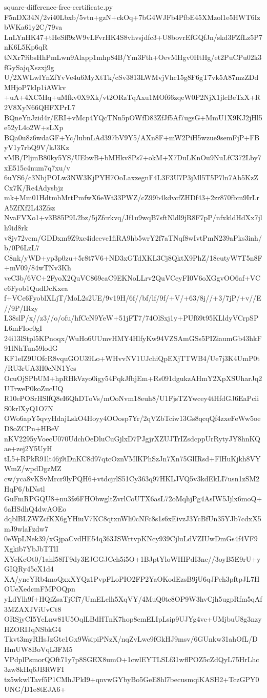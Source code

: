 \documentclass[11pt]{article}
\theoremstyle{definition}
\theoremstyle{remark}
\begin{document}
\begin{filecontents*}[overwrite]{square-difference-free-certificate.py}
F5nDX34N/2vi40Lbxb/5vtn+gzN+ckOq+7bG4WJFb4PfbE45XMzol1e5HWT6IzbWKa61y2C/79va
LnLYnHK47+tHeSff9zW9vLFvrHK4S8vhvsjdfc3+U8bovrEfGQfJn/skd3FZfLz5P7nK6L5Kp6qR
tNXr79ibsHhPmLwn9Alapp1mhp84B/Ym3Fth+OevMHgv0HtHg/et2PuCPu02k3fGySajqXszxj9g
U/2XWLwlYnZfYvVe4u6MyXtTk/cSv3813LWMvjVhc15g8F6gT7vk5A87mzZDdMHjoP7kIp1iAWkv
+uA+4XC5Hq+uMfkv0X9Xk/vt2ORzTqAxu1MOf66zqeW0P2NjX1jlcBeTxX+R2V8XyN66QHFXPrL7
BQneYnJzid4r/ERI+vMcp4YQcTNn5pOWfD83ZfJf5Af7ugsG+MmU1X9KJ2jHl5e52yL4o2W+sLXp
BQa0u8z6wdaGF+Yc/lubnLAd397bV9Y5/AXn8F+mW2PiH5wzue9semFjP+FByV1y7rbQ9V/kJ3Kz
vMB/PljmB80ky5YS/UEbwB+bMHkv8Ps7+okM+X7DuLKnOu9NuLfC372Lby7xE515c4num7q7xu/v
6uYS6/c3NbjPOLw3NW3KjPYH7OoLaxzegnF4L3F3U7P3jMl5T5P7ln7Ab5KzZCx7K/Re4Adysbjz
mk+Mm01HdtmbMrtPmfwX6eWt33PWZ/cZ99b4kdvcfZHDf43+2zr870fbm9IrLrA5ZfXf2L43Zfsz
NvaFVXo1+v3B85P9L2bz/5jZfcrkvq/Jf1u9wqB7sftNldl9jR8F7pP/nfxkldHdXx7jlh9id8rk
v8jv72vem/GDDxm9Z9xc4ideevc1fiRA9hb5wrY2f7aTNqf8wIvtPmN239aPks3inh/b/0P6LzL7
C8nk/yWD+yp3p0zu+5r8t7V6+ND3xGTdXKL3Cj8QktX9PhZ/18eutyW7T5n8F+mV09/84wTNv3Kh
veC3b/6VC+2FyoX2QuVC869caC9EKNoLLrv2QuVCeyFI0V6oXGgvOO6af+VCe6Fyob1QudDcKxea
f+VCe6FyoblXLjT/MoL2s2UE/9v19H/6f//bf/lf/9f/+V/+63/8j//+3/7jP/+v//E//9P/IRzy
L38slP/x//z3//o/ofu/hfCcN9YeW+51jFT7/74OlSxj1y+PUf69t95KLldyVCrpSPL6mFIoc0gI
24i13lStpl5KPnoqx/WuHo6UUmvHMY4HlfyKw94VZSAmGSs5PIZiaumGb43hkF91lNhTun59lodG
KF1elZ9UOfcR8vquGOU39Lo+WHvvNV1UJchiQpEXjTTWB4/Ue7j3K4UmP0t/RU3rUA3H0cNN1Ycs
OcuOjSPbUM+hpRHkVzyo0igy54PqkJfbjEm+Rs091dgukzAHmY2XpXSUharJq2UTrweP0koZucUQ
R10ePOSrHSlfQ8eI6QhDToVs/mOoNvm18euh8/U1FjsTZYwcey4tHfdGJ6EaPciiS0krlXyQ1O7N
OWo6apY5qvyHdajLskO4Hoyy4OOosp7Yr/2qVZbTciw13Gs8qcqQf4zxeFeWw5oeD8oZCPn+HBeV
nKV2295yVoecU070UdchOeDluCuGjlxD7PJgjrXZUJTrIZsdcppUrRytyJY8hnKQae+zej2Y5UyH
tL5+RPkR91lt46j9iDnKC8d97qtcOznVMlKPhSzJn7Xn75GlIRsd+FlHuKjkh8VYWmZ/wpdDgzMZ
cw/yca8vKSvMrcr9lyPQH6+vtdcjrlS51Cy363q97HKLJVQ5v3kdEkLI7usn1zSM2HqP6/bINstl
GuFmRPGQU8+nu3fs6FHObwgltZvrlCoUTX6asL72oMqhjPg4AsIW5Jjlx6moQ+6aHSdhQ4dwAOEo
dqblBLZWZcfKX6gYHiuV7KC8qtxnWli0cNFc8s1s6xEivzJ3YcBfUn35YJb7cdxX5mJ9wlaFzdw7
0eWpLNek39/xGjpaCvdHE54q363JSWrtvpKNcy939CjluLdVZIUwDmGs4f4VF9Xgkib7YbJbTTlI
XYeKcOt0/1ahl58lT9dy3EJGGJCch5i5O+1BJptYloWHIPdI3ne//3oyB5E9rU+yGIQRy45cX1d4
XA/yncYRb4moQxxXYQz1PvpFLoPIO2FP2YaOKodEzsB9jU6qJPeh3pftpJL7HOUeXedcmFMPOQpn
yLdYlh9f+HQiZsaTjCf7/UmELclh5XqVY/4MuQ0tc8OP9W3hvCjh5ugpRfm5qAf3MZAXJViUvCt8
ORSjyCI5YcLnw81U5OqlLBdHTnK7hop8cmELIpLsip9UJYg4vc+UMjbuU8g3nzyHZORIJqNSbkG4
Tkvt3myRHsJzGtc1Gx9WsipiPNzX/nqZvLwc9fGkHJ9msv/6GUnkw31ahOfL/DHmUW8BoVqL3FM5
VPdplPsmorQOft71y7p8SGEX8umO+1cwlEYTLSLf31wflPOZ5cZdQyL75HrLhc3zw8kHq6JBRWFI
tz5wkwlTavf5P1CMhJPkI9+qnvwGYbyBo5GeE8hl7becusmqiKASH2+TczGPY0UNG/D1e8tEJA6+

\end{filecontents*}
\end{document}
